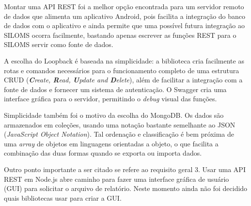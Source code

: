 Montar uma API REST foi a melhor opção encontrada para um servidor remoto de dados que alimenta um aplicativo Android, pois facilita a integração do banco de dados com o aplicativo e ainda permite que uma possível futura integração ao SILOMS ocorra facilmente, bastando apenas escrever as funções REST para o SILOMS servir como fonte de dados.

A escolha do Loopback é baseada na simplicidade: a biblioteca cria facilmente as rotas e comandos necessários para o funcionamento completo de uma estrutura CRUD (\textit{\textbf{C}reate, \textbf{R}ead, \textbf{U}pdate and \textbf{D}elete}), além de facilitar a integração com a fonte de dados e fornecer um sistema de autenticação. O Swagger cria uma interface gráfica para o servidor, permitindo o \textit{debug} visual das funções.

Simplicidade também foi o motivo da escolha do MongoDB. Os dados são armazenados em coleções, usando uma notação bastante semelhante ao JSON (\textit{JavaScript Object Notation}). Tal ordenação e classificação é bem próxima de uma \textit{array} de objetos em linguagens orientadas a objeto, o que facilita a combinação das duas formas quando se exporta ou importa dados.

Outro ponto importante a ser citado se refere ao requisito geral 3. Usar uma API REST em Node.js abre caminho para fazer uma interface gráfica de usuário (GUI) para solicitar o arquivo de relatório. Neste momento ainda não foi decidido quais bibliotecas usar para criar a GUI.
